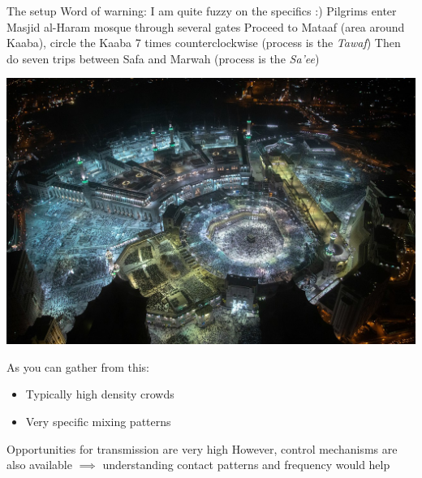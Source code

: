 \documentclass[aspectratio=43]{beamer}
\begin{document}
\begin{frame}{The setup}
Word of warning: I am quite fuzzy on the specifics :)
\vfill
Pilgrims enter Masjid al-Haram mosque through several gates
\vfill
Proceed to Mataaf (area around Kaaba), circle the Kaaba 7 times counterclockwise (process is the \emph{Tawaf})
\vfill
Then do seven trips between Safa and Marwah (process is the \emph{Sa'ee})
\end{frame}

\begin{frame}
\begin{center}
\includegraphics[width=\textwidth]{FIGS/Great_Mosque_of_Mecca.jpg}
\end{center}
\end{frame}

\begin{frame}
As you can gather from this:
\begin{itemize}
\item Typically high density crowds
\item Very specific mixing patterns
\end{itemize}
\vfill
Opportunities for transmission are very high
\vfill
However, control mechanisms are also available
\vfill
$\implies$ understanding contact patterns and frequency would help
\end{frame}
\end{document}
